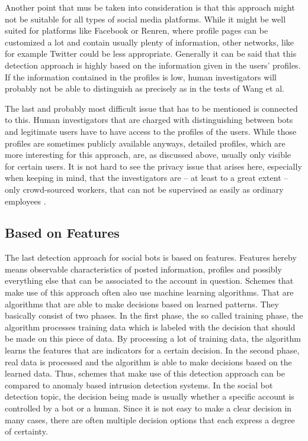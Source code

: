 Another point that mus be taken into consideration is that this approach might not be suitable for all types of social media platforms. While it might be well suited for platforms like Facebook or Renren, where profile pages can be customized a lot and contain usually plenty of information, other networks, like for example Twitter could be less appropriate. Generally it can be said that this detection approach is highly based on the information given in the users' profiles. If the information contained in the profiles is low, human investigators will probably not be able to distinguish as precisely as in the tests of Wang et al.

The last and probably most difficult issue that has to be mentioned is connected to this. Human investigators that are charged with distinguishing between bots and legitimate users have to have access to the profiles of the users. While those profiles are sometimes publicly available anyways, detailed profiles, which are more interesting for this approach, are, as discussed above, usually only visible for certain users. It is not hard to see the privacy issue that arises here, especially when keeping in mind, that the investigators are -- at least to a great extent -- only crowd-sourced workers, that can not be supervised as easily as ordinary employees \cite{ferrara15}.


\subsection{Based on Features}
The last detection approach for social bots is based on features. Features hereby means observable characteristics of posted information, profiles and possibly everything else that can be associated to the account in question. Schemes that make use of this approach often also use machine learning algorithms. That are algorithms that are able to make decisions based on learned patterns. They basically consist of two phases. In the first phase, the so called training phase, the algorithm processes training data which is labeled with the decision that should be made on this piece of data. By processing a lot of training data, the algorithm learns the features that are indicators for a certain decision. In the second phase, real data is processed and the algorithm is able to make decisions based on the learned data. Thus, schemes that make use of this detection approach can be compared to anomaly based intrusion detection systems. In the social bot detection topic, the decision being made is usually whether a specific account is controlled by a bot or a human. Since it is not easy to make a clear decision in many cases, there are often multiple decision options that each express a degree of certainty.

